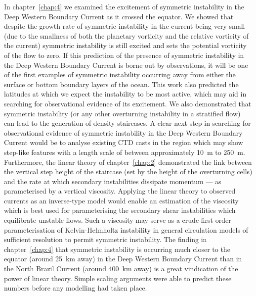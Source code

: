 In chapter~\ref{chap:4} we examined the excitement of symmetric instability in the Deep Western Boundary Current as it crossed the equator. We showed that despite the growth rate of symmetric instability in the current being very small (due to the smallness of both the planetary vorticity and the relative vorticity of the current) symmetric instability is still excited and sets the potential vorticity of the flow to zero. If this prediction of the presence of symmetric instability in the Deep Western Boundary Current is borne out by observations, it will be one of the first examples of symmetric instability occurring away from either the surface or bottom boundary layers of the ocean. This work also predicted the latitudes at which we expect the instability to be most active, which may aid in searching for observational evidence of its excitement. We also demonstrated that symmetric instability (or any other overturning instability in a stratified flow) can lead to the generation of density staircases. A clear next step in searching for observational evidence of symmetric instability in the Deep Western Boundary Current would be to analyse existing CTD casts in the region which may show step-like features with a length scale of between approximately 10~m to 250~m. Furthermore, the linear theory of chapter~\ref{chap:2} demonstrated the link between the vertical step height of the staircase (set by the height of the overturning cells) and the rate at which secondary instabilities dissipate momentum --- as parameterised by a vertical viscosity. Applying the linear theory to observed currents as an inverse-type model would enable an estimation of the viscosity which is best used for parameterising the secondary shear instabilities which equilibrate unstable flows. Such a viscosity may serve as a crude first-order parameterisation of Kelvin-Helmholtz instability in general circulation models of sufficient resolution to permit symmetric instability. The finding in chapter~\ref{chap:4} that symmetric instability is occurring much closer to the equator (around 25~km away) in the Deep Western Boundary Current than in the North Brazil Current (around 400~km away) is a great vindication of the power of linear theory. Simple scaling arguments were able to predict these numbers before any modelling had taken place.

